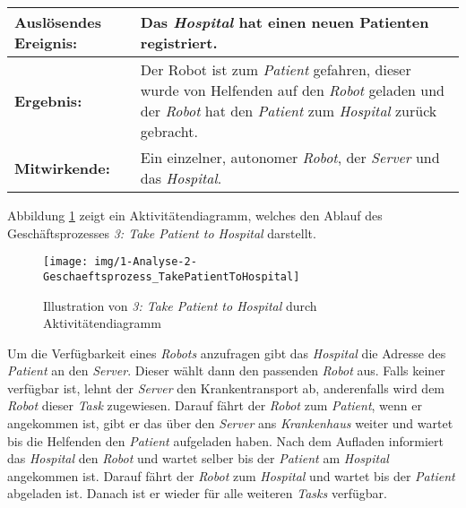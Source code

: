 			\begin{table}[H]
				\centering
				\begin{tabularx}{\textwidth}{@{}p{3cm}X@{}}
				\hline
				\textbf{Auslösendes Ereignis:} & Das \emph{Hospital} hat einen neuen Patienten registriert.\\ \hline
				\textbf{Ergebnis:} & Der Robot ist zum \emph{Patient} gefahren, dieser wurde von Helfenden auf den \emph{Robot} geladen 
				und der \emph{Robot} hat den \emph{Patient} zum \emph{Hospital} zurück gebracht.\\ \hline
				\textbf{Mitwirkende:} &	Ein einzelner, autonomer \emph{Robot}, der \emph{Server} und das \emph{Hospital}. \\
				\hline
				\end{tabularx}
				\label{tab:2-4-take-patient-to-hospital}
			\end{table}

			Abbildung \ref{fig:2-4-take-patient-to-hospital-aktivitaetendiagramm} zeigt ein Aktivitätendiagramm, welches den Ablauf des Geschäftsprozesses \emph{3: Take Patient to Hospital} darstellt.

			\begin{figure}[H]
				\centering
				\texttt{[image: img/1-Analyse-2-Geschaeftsprozess\_TakePatientToHospital]}
				\caption{Illustration von \emph{3: Take Patient to Hospital} durch Aktivitätendiagramm}
				\label{fig:2-4-take-patient-to-hospital-aktivitaetendiagramm}
			\end{figure}

			Um die Verfügbarkeit eines \emph{Robots} anzufragen gibt das \emph{Hospital} die Adresse des \emph{Patient} an den \emph{Server}. Dieser wählt dann den passenden \emph{Robot} aus. Falls keiner verfügbar ist, lehnt der \emph{Server} den Krankentransport ab, anderenfalls wird dem \emph{Robot} dieser \emph{Task} zugewiesen. Darauf fährt der \emph{Robot} zum \emph{Patient}, wenn er angekommen ist, gibt er das über den \emph{Server} ans \emph{Krankenhaus} weiter und wartet bis die Helfenden den \emph{Patient} aufgeladen haben. Nach dem Aufladen informiert das \emph{Hospital} den \emph{Robot} und wartet selber bis der \emph{Patient} am \emph{Hospital} angekommen ist. Darauf fährt der \emph{Robot} zum \emph{Hospital} und wartet bis der \emph{Patient} abgeladen ist. Danach ist er wieder für alle weiteren \emph{Tasks} verfügbar.

	\pagebreak

	
